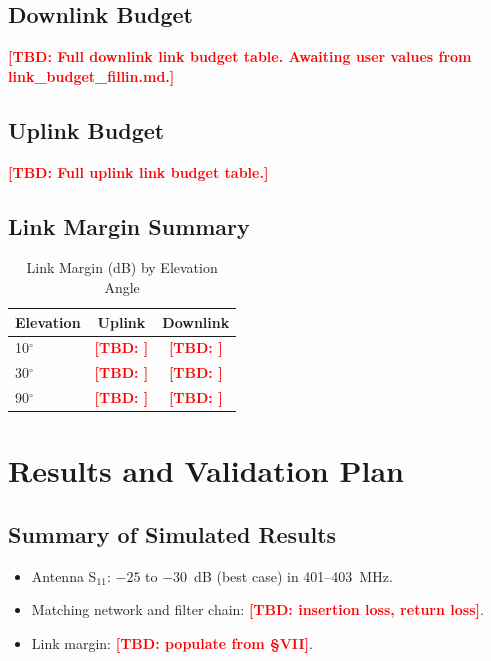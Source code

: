 \documentclass[conference]{IEEEtran}
\newcommand{\tbd}[1]{\textcolor{red}{\textbf{[TBD: #1]}}}
\begin{document}
\subsection{Downlink Budget}
\tbd{Full downlink link budget table. Awaiting user values from link\_budget\_fillin.md.}

\subsection{Uplink Budget}
\tbd{Full uplink link budget table.}

\subsection{Link Margin Summary}

\begin{table}[!t]
\caption{Link Margin (dB) by Elevation Angle}
\label{tab:margin}
\centering
\begin{tabular}{lcc}
\toprule
\textbf{Elevation} & \textbf{Uplink} & \textbf{Downlink} \\
\midrule
10$^\circ$ & \tbd{} & \tbd{} \\
30$^\circ$ & \tbd{} & \tbd{} \\
90$^\circ$ & \tbd{} & \tbd{} \\
\bottomrule
\end{tabular}
\end{table}

\section{Results and Validation Plan}

\subsection{Summary of Simulated Results}
\begin{itemize}
\item Antenna S$_{11}$: $-25$ to $-30$~dB (best case) in 401--403~MHz.
\item Matching network and filter chain: \tbd{insertion loss, return loss}.
\item Link margin: \tbd{populate from §VII}.
\end{itemize}
\end{document}
